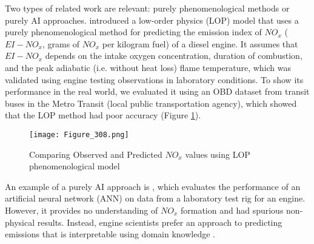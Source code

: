 \documentclass[letterpaper]{article} %
\begin{document}
Two types of related work are relevant: purely phenomenological methods or purely AI  approaches. \cite{HeX.2008Livc} introduced a low-order physics (LOP) model that uses a purely phenomenological method for predicting the emission index of $NO_{x}$ ($EI{-}NO_{x}$, grams of $NO_{x}$ per kilogram fuel) of a diesel engine. It assumes that $EI-NO_{x}$ depends on the intake oxygen concentration, duration of combustion, and the peak adiabatic (i.e. without heat loss) flame temperature, which was validated using engine testing observations in laboratory conditions. To show its performance in the real world, we evaluated it using an OBD dataset from transit buses in the Metro Transit (local public transportation agency), which showed that the LOP method had poor accuracy (Figure \ref{fig:noxLOP}).


 
\begin{figure}[h!]
    \centering
    \texttt{[image:  Figure\_308.png]}
    \caption{Comparing Observed and Predicted $NO_{x}$ values using LOP phenomenological model}
    \label{fig:noxLOP}
\end{figure}

An example of a purely AI approach is \cite{Obodeh2009EvaluationOA}, which evaluates the performance of an artificial neural network (ANN) on data from a laboratory test rig for an engine. However, it provides no understanding of $NO_{x}$ formation and had spurious non-physical results. Instead, engine scientists prefer an approach to predicting emissions that is interpretable using domain knowledge \cite{karpatne2018physics,7959606,li2020physics,LiYan2018Peps}. 
\end{document}
